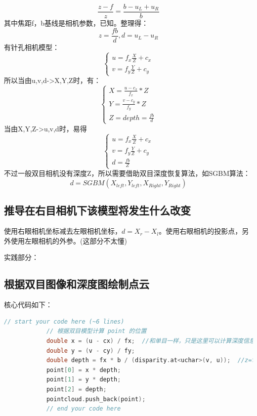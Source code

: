 \documentclass[40pt,a4paper，UTF8]{ctexart}
\numberwithin{equation}{section}
\begin{document}
\begin{equation}
\frac{z-f}{z}=\frac{b-u_L+u_R}{b}
\end{equation}
其中焦距f，b基线是相机参数，已知。整理得：
\begin{equation}
z=\frac{fb}{d},d=u_L-u_R
\end{equation}
有针孔相机模型：
\begin{equation}
\left\{
\begin{array}{l}
u = f_x \frac{X}{Z}+c_x\\
v = f_y \frac{Y}{Z}+c_y
\end{array}
\right.
\end{equation}
所以当由u,v,d->X,Y,Z时，有：
\begin{equation}
\left\{
\begin{array}{l}
X=\frac{u-c_x}{f_x}*Z\\
Y=\frac{v-c_y}{f_y}*Z\\
Z=depth=\frac{fb}{d}
\end{array}
\right.
\end{equation}
当由X,Y,Z->u,v,d时，易得
\begin{equation}
\left\{
\begin{array}{l}
u = f_x \frac{X}{Z}+c_x\\
v = f_y \frac{Y}{Z}+c_y\\
d=\frac{fb}{Z}
\end{array}
\right.
\end{equation}
不过一般双目相机没有深度Z，所以需要借助双目深度恢复算法，如SGBM算法：
\begin{equation}
d=SGBM(X_{left},Y_{left},X_{Right},Y_{Right})
\end{equation}

\subsection{推导在右目相机下该模型将发生什么改变}
使用右眼相机坐标减去左眼相机坐标，$d=X_r-X_l$。使用右眼相机的投影点，另外使用左眼相机的外参。(这部分不太懂)




实践部分：
\subsection{根据双目图像和深度图绘制点云}
核心代码如下：
\begin{lstlisting}[language=C++, caption=工程/stereoVision.cpp]
            // start your code here (~6 lines)
            // 根据双目模型计算 point 的位置
            double x = (u - cx) / fx;  //和单目一样，只是这里可以计算深度信息，所以可以构建点云
            double y = (v - cy) / fy;
            double depth = fx * b / (disparity.at<uchar>(v, u));  //z=fb/d
            point[0] = x * depth;
            point[1] = y * depth;
            point[2] = depth;
            pointcloud.push_back(point);
            // end your code here
\end{lstlisting}
\end{document}
